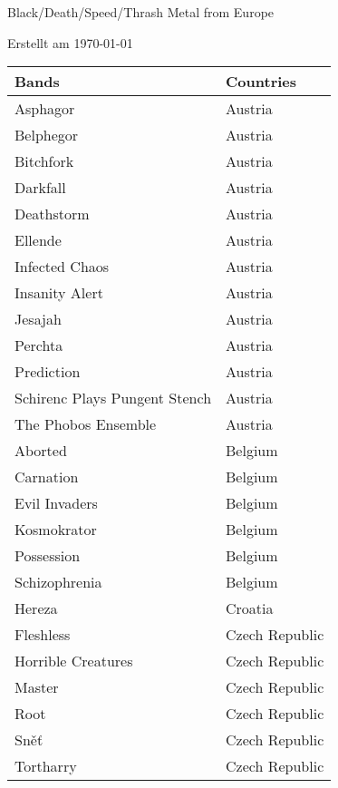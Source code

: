 \documentclass[12pt, a4paper, twoside]{report}
\begin{document}
	
	\begin{center}
		\vspace{1cm}
		{\Large Black/Death/Speed/Thrash Metal from Europe\par}
		
		{\large Erstellt am \today\par}
	\end{center}
	
	\begin{center}
		\begin{longtable}{|p{5cm}|p{5cm}|} 
			
			\hline
			\rowcolor{lightgray} Bands & Countries \\ \hline
			\endhead
Asphagor & Austria \\ \hline
Belphegor & Austria \\ \hline
Bitchfork & Austria \\ \hline
Darkfall & Austria \\ \hline
Deathstorm & Austria \\ \hline
Ellende & Austria \\ \hline
Infected Chaos & Austria \\ \hline
Insanity Alert & Austria \\ \hline
Jesajah & Austria \\ \hline
Perchta & Austria \\ \hline
Prediction & Austria \\ \hline
Schirenc Plays Pungent Stench & Austria \\ \hline
The Phobos Ensemble & Austria \\ \hline
Aborted & Belgium \\ \hline
Carnation & Belgium \\ \hline
Evil Invaders & Belgium \\ \hline
Kosmokrator & Belgium \\ \hline
Possession & Belgium \\ \hline
Schizophrenia & Belgium \\ \hline
Hereza & Croatia \\ \hline
Fleshless & Czech Republic \\ \hline
Horrible Creatures & Czech Republic \\ \hline
Master & Czech Republic \\ \hline
Root & Czech Republic \\ \hline
Sněť & Czech Republic \\ \hline
Tortharry & Czech Republic \\ \hline

\end{longtable}
\end{center}
\end{document}
